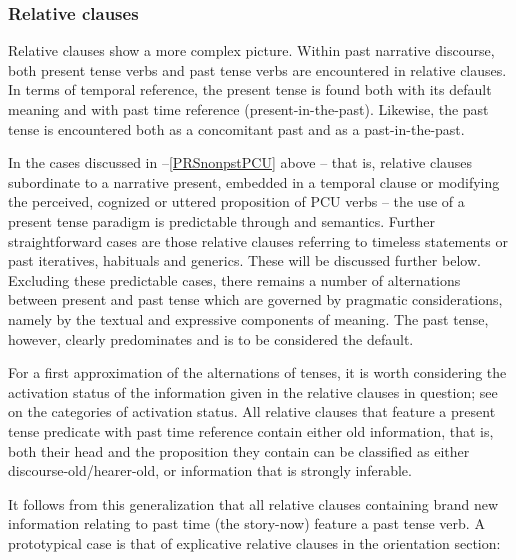 \subsubsection{Relative clauses}\label{PRSnonPSTRelativeClauses}
Relative clauses show a more complex picture. Within past narrative discourse, both present tense verbs and past tense verbs are encountered in relative clauses. In terms of temporal reference, the present tense is found both with its default meaning and with past time reference (present-in-the-past). Likewise, the past tense is encountered both as a concomitant past and as a past-in-the-past.

In the cases discussed in --\ref{PRSnonpstPCU} above -- that is, relative clauses subordinate to a narrative present, embedded in a temporal clause or modifying the perceived, cognized or uttered proposition of PCU verbs -- the use of a present tense paradigm is predictable through  and semantics. Further straightforward cases are those relative clauses referring to timeless statements or past iteratives, habituals and generics. These will be discussed further below. Excluding these predictable cases, there remains a number of alternations between present and past tense which are governed by pragmatic considerations, namely by the textual and expressive components of meaning. The past tense, however, clearly predominates and is to be considered the default.

For a first approximation of the alternations of tenses, it is worth considering the activation status of the information given in the relative clauses in question; see  on the categories of activation status.  All relative clauses that feature a present tense predicate with past time reference contain either old information, that is, both their head and the proposition they contain can be classified as either discourse-old/hearer-old, or information that is strongly inferable.

It follows from this generalization that all relative clauses containing brand new information relating to past time (the story-now) feature a past tense verb. A prototypical case is that of explicative relative clauses in the orientation section:

